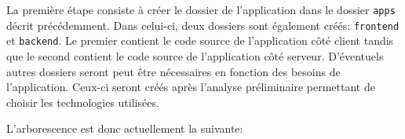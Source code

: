 La première étape consiste à créer le dossier de l'application dans le dossier \texttt{apps} décrit précédemment. Dans celui-ci, deux dossiers sont également créés: \texttt{frontend} et \texttt{backend}. Le premier contient le code source de l'application côté client tandis que le second contient le code source de l'application côté serveur. D'éventuels autres dossiers seront peut être nécessaires en fonction des besoins de l'application. Ceux-ci seront créés après l'analyse préliminaire permettant de choisir les technologies utilisées.

L'arborescence est donc actuellement la suivante:


